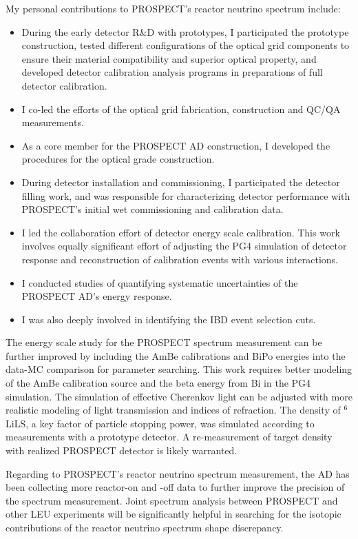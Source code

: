 
My personal contributions to PROSPECT's reactor neutrino spectrum include:
\begin{itemize}
	\item During the early detector R\&D with prototypes, I participated the prototype construction, tested different configurations of the optical grid components to ensure their material compatibility and superior optical property, and developed detector calibration analysis programs in preparations of full detector calibration.
	\item I co-led the efforts of the optical grid fabrication, construction and QC/QA measurements.
	\item As a core member for the PROSPECT AD construction, I developed the procedures for the optical grade construction.
	\item During detector installation and commissioning, I participated the detector filling work, and was responsible for characterizing detector performance with PROSPECT's initial wet commissioning and calibration data.
	\item I led the collaboration effort of detector energy scale calibration. This work involves equally significant effort of adjusting the PG4 simulation of detector response and reconstruction of calibration events with various interactions.
	\item I conducted studies of quantifying systematic uncertainties of the PROSPECT AD's energy response.
	\item I was also deeply involved in identifying the IBD event selection cuts.
\end{itemize}


The energy scale study for the PROSPECT spectrum measurement can be further improved by including the AmBe calibrations and BiPo energies into the data-MC comparison for parameter searching. 
This work requires better modeling of the AmBe calibration source and the beta energy from Bi in the PG4 simulation.
The simulation of effective Cherenkov light can be adjusted with more realistic modeling of light transmission and indices of refraction.
The density of $^6$LiLS, a key factor of particle stopping power, was simulated according to measurements with a prototype detector.
A re-measurement of target density with realized PROSPECT detector is likely warranted.

Regarding to PROSPECT's reactor neutrino spectrum measurement, the AD has been collecting more reactor-on and -off data to further improve the precision of the spectrum measurement.
Joint spectrum analysis between PROSPECT and other LEU experiments will be significantly helpful in searching for the isotopic contributions of the reactor neutrino spectrum shape discrepancy.